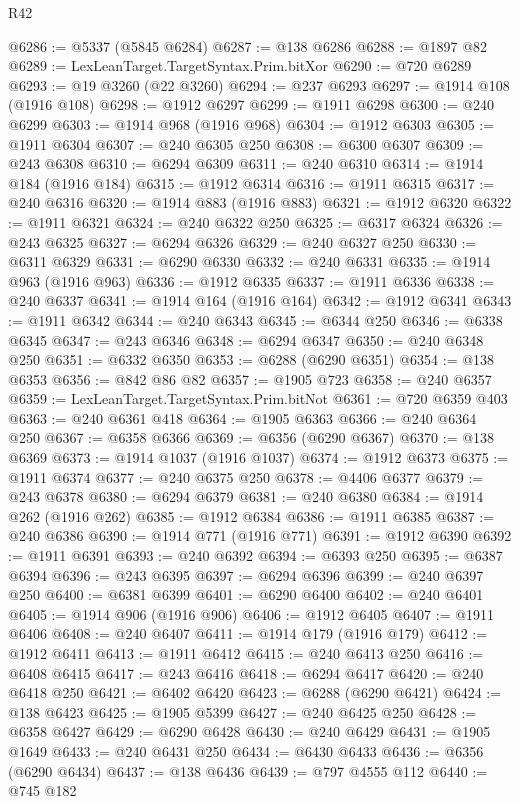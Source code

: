 \begin{lexlean}{R42}
\begin{coremodule}
{@6286 := @5337 (@5845 @6284)
@6287 := @138 @6286
@6288 := @1897 @82
@6289 := LexLeanTarget.TargetSyntax.Prim.bitXor
@6290 := @720 @6289
@6293 := @19 @3260 (@22 @3260)
@6294 := @237 @6293
@6297 := @1914 @108 (@1916 @108)
@6298 := @1912 @6297
@6299 := @1911 @6298
@6300 := @240 @6299
@6303 := @1914 @968 (@1916 @968)
@6304 := @1912 @6303
@6305 := @1911 @6304
@6307 := @240 @6305 @250
@6308 := @6300 @6307
@6309 := @243 @6308
@6310 := @6294 @6309
@6311 := @240 @6310
@6314 := @1914 @184 (@1916 @184)
@6315 := @1912 @6314
@6316 := @1911 @6315
@6317 := @240 @6316
@6320 := @1914 @883 (@1916 @883)
@6321 := @1912 @6320
@6322 := @1911 @6321
@6324 := @240 @6322 @250
@6325 := @6317 @6324
@6326 := @243 @6325
@6327 := @6294 @6326
@6329 := @240 @6327 @250
@6330 := @6311 @6329
@6331 := @6290 @6330
@6332 := @240 @6331
@6335 := @1914 @963 (@1916 @963)
@6336 := @1912 @6335
@6337 := @1911 @6336
@6338 := @240 @6337
@6341 := @1914 @164 (@1916 @164)
@6342 := @1912 @6341
@6343 := @1911 @6342
@6344 := @240 @6343
@6345 := @6344 @250
@6346 := @6338 @6345
@6347 := @243 @6346
@6348 := @6294 @6347
@6350 := @240 @6348 @250
@6351 := @6332 @6350
@6353 := @6288 (@6290 @6351)
@6354 := @138 @6353
@6356 := @842 @86 @82
@6357 := @1905 @723
@6358 := @240 @6357
@6359 := LexLeanTarget.TargetSyntax.Prim.bitNot
@6361 := @720 @6359 @403
@6363 := @240 @6361 @418
@6364 := @1905 @6363
@6366 := @240 @6364 @250
@6367 := @6358 @6366
@6369 := @6356 (@6290 @6367)
@6370 := @138 @6369
@6373 := @1914 @1037 (@1916 @1037)
@6374 := @1912 @6373
@6375 := @1911 @6374
@6377 := @240 @6375 @250
@6378 := @4406 @6377
@6379 := @243 @6378
@6380 := @6294 @6379
@6381 := @240 @6380
@6384 := @1914 @262 (@1916 @262)
@6385 := @1912 @6384
@6386 := @1911 @6385
@6387 := @240 @6386
@6390 := @1914 @771 (@1916 @771)
@6391 := @1912 @6390
@6392 := @1911 @6391
@6393 := @240 @6392
@6394 := @6393 @250
@6395 := @6387 @6394
@6396 := @243 @6395
@6397 := @6294 @6396
@6399 := @240 @6397 @250
@6400 := @6381 @6399
@6401 := @6290 @6400
@6402 := @240 @6401
@6405 := @1914 @906 (@1916 @906)
@6406 := @1912 @6405
@6407 := @1911 @6406
@6408 := @240 @6407
@6411 := @1914 @179 (@1916 @179)
@6412 := @1912 @6411
@6413 := @1911 @6412
@6415 := @240 @6413 @250
@6416 := @6408 @6415
@6417 := @243 @6416
@6418 := @6294 @6417
@6420 := @240 @6418 @250
@6421 := @6402 @6420
@6423 := @6288 (@6290 @6421)
@6424 := @138 @6423
@6425 := @1905 @5399
@6427 := @240 @6425 @250
@6428 := @6358 @6427
@6429 := @6290 @6428
@6430 := @240 @6429
@6431 := @1905 @1649
@6433 := @240 @6431 @250
@6434 := @6430 @6433
@6436 := @6356 (@6290 @6434)
@6437 := @138 @6436
@6439 := @797 @4555 @112
@6440 := @745 @182
}
\end{coremodule}
\end{lexlean}
